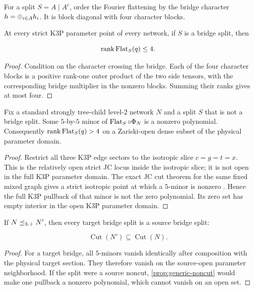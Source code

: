 For a split \(S=A\mid A^c\), order the Fourier flattening by the bridge
character \(h=\mathbin\oplus_{i\in A}h_i\).  It is block diagonal with four character
blocks.

\begin{proposition}\label{prop:true-cut}
At every strict K3P parameter point of every network, if \(S\) is a bridge
split, then

\[
 \operatorname{rank}\operatorname{Flat}_S(q)\le4.
\]
\end{proposition}

\begin{proof}
Condition on the character crossing the bridge.  Each of the four character
blocks is a positive rank-one outer product of the two side tensors, with the
corresponding bridge multiplier in the nonzero blocks.  Summing their ranks
gives at most four.
\end{proof}

\begin{proposition}\label{prop:generic-noncut}
Fix a standard strongly tree-child level-2 network \(N\) and a split \(S\)
that is not a bridge split.  Some \(5\)-by-\(5\) minor of
\(\operatorname{Flat}_S\circ\Phi_N\)
is a nonzero polynomial.  Consequently
\(\operatorname{rank}\operatorname{Flat}_S(q)>4\) on a Zariski-open dense subset of the physical parameter
domain.
\end{proposition}

\begin{proof}
Restrict all three K3P edge sectors to the isotropic slice \(c=g=t=x\).
This is the relatively open strict JC locus inside the isotropic slice; it is
not open in the full K3P parameter domain.  The exact JC cut theorem for the
same fixed mixed graph gives a strict isotropic point at which a \(5\)-minor
is nonzero \cite{KriebelJC2026}.  Hence the full K3P pullback of that minor is
not the zero polynomial.  Its zero set has empty interior in the open K3P
parameter domain.
\end{proof}

\begin{corollary}\label{cor:target-source-cut}
If \(N\preceq_{3,+} N'\), then every target bridge split is a source bridge
split:

\[
 \operatorname{Cut}(N')\subseteq\operatorname{Cut}(N).
\]
\end{corollary}

\begin{proof}
For a target bridge, all \(5\)-minors vanish identically after composition
with the physical target section.  They therefore vanish on the source-open
parameter neighborhood.  If the split were a source noncut,
\cref{prop:generic-noncut} would make one pullback a nonzero polynomial,
which cannot vanish on an open set.
\end{proof}

